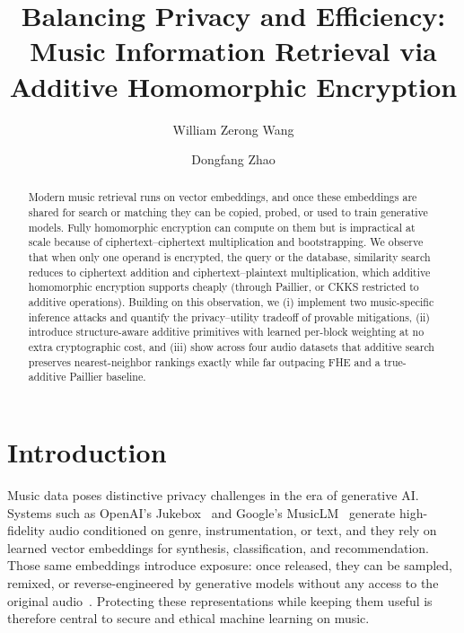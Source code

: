 \documentclass[sigconf,nonacm]{acmart}
\begin{document}
\title{Balancing Privacy and Efficiency: Music Information Retrieval via Additive Homomorphic Encryption}
\author{William Zerong Wang}
\author{Dongfang Zhao}
\renewcommand{\shortauthors}{Wang and Zhao}

\begin{abstract}
Modern music retrieval runs on vector embeddings, and once these embeddings are shared for search or matching they can be copied, probed, or used to train generative models. Fully homomorphic encryption can compute on them but is impractical at scale because of ciphertext--ciphertext multiplication and bootstrapping. We observe that when only one operand is encrypted, the query or the database, similarity search reduces to ciphertext addition and ciphertext--plaintext multiplication, which additive homomorphic encryption supports cheaply (through Paillier, or CKKS restricted to additive operations). Building on this observation, we (i) implement two music-specific inference attacks and quantify the privacy--utility tradeoff of provable mitigations, (ii) introduce structure-aware additive primitives with learned per-block weighting at no extra cryptographic cost, and (iii) show across four audio datasets that additive search preserves nearest-neighbor rankings exactly while far outpacing FHE and a true-additive Paillier baseline.
\end{abstract}
\maketitle

\section{Introduction}
Music data poses distinctive privacy challenges in the era of generative AI. Systems such as OpenAI's Jukebox~\cite{dhariwal2020jukebox} and Google's MusicLM~\cite{agostinelli2023musiclm} generate high-fidelity audio conditioned on genre, instrumentation, or text, and they rely on learned vector embeddings for synthesis, classification, and recommendation. Those same embeddings introduce exposure: once released, they can be sampled, remixed, or reverse-engineered by generative models without any access to the original audio~\cite{briot2017deep,esling2018bridging,ferguson2023generative}. Protecting these representations while keeping them useful is therefore central to secure and ethical machine learning on music.
\end{document}
